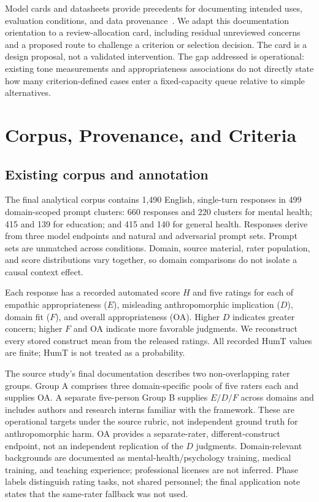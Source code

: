 \documentclass[manuscript,screen,review,anonymous]{acmart}
\begin{document}
Model cards and datasheets provide precedents for documenting intended uses, evaluation conditions, and data provenance~\cite{mitchell2019modelcards,gebru2021datasheets}. We adapt this documentation orientation to a review-allocation card, including residual unreviewed concerns and a proposed route to challenge a criterion or selection decision. The card is a design proposal, not a validated intervention. The gap addressed is operational: existing tone measurements and appropriateness associations do not directly state how many criterion-defined cases enter a fixed-capacity queue relative to simple alternatives.

\section{Corpus, Provenance, and Criteria}
\subsection{Existing corpus and annotation}
The final analytical corpus contains 1,490 English, single-turn responses in 499 domain-scoped prompt clusters: 660 responses and 220 clusters for mental health; 415 and 139 for education; and 415 and 140 for general health. Responses derive from three model endpoints and natural and adversarial prompt sets. Prompt sets are unmatched across conditions. Domain, source material, rater population, and score distributions vary together, so domain comparisons do not isolate a causal context effect.

Each response has a recorded automated score $H$ and five ratings for each of empathic appropriateness ($E$), misleading anthropomorphic implication ($D$), domain fit ($F$), and overall appropriateness (OA). Higher $D$ indicates greater concern; higher $F$ and OA indicate more favorable judgments. We reconstruct every stored construct mean from the released ratings. All recorded HumT values are finite; HumT is not treated as a probability.

The source study's final documentation describes two non-overlapping rater groups. Group A comprises three domain-specific pools of five raters each and supplies OA. A separate five-person Group B supplies $E/D/F$ across domains and includes authors and research interns familiar with the framework. These are operational targets under the source rubric, not independent ground truth for anthropomorphic harm. OA provides a separate-rater, different-construct endpoint, not an independent replication of the $D$ judgments. Domain-relevant backgrounds are documented as mental-health/psychology training, medical training, and teaching experience; professional licenses are not inferred. Phase labels distinguish rating tasks, not shared personnel; the final application note states that the same-rater fallback was not used.
\end{document}
